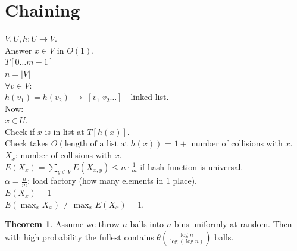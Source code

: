 \documentclass[a4paper, 12pt]{book}
\theoremstyle{definition}
\newtheorem{theorem}[counter]{Theorem}
\theoremstyle{remark}
\begin{document}
\section{Chaining}

$V, U, h: U \to V$. \\
Answer $x \in V$ in $O(1)$. \\
$T[0 \dots m-1]$ \\
$n = |V|$ \\
$\forall v \in V$: \\
$h(v_1) = h(v_2) \; \to \; [v_1 \; v_2 \dots]$ - linked list. \\
Now: \\
$x \in U$. \\
Check if $x$ is in list at $T[h(x)]$. \\
Check takes $O(\text{length of a list at }h(x))$ = $1 +$ number of collisions with $x$. \\
$X_x$: number of collisions with $x$. \\
$E(X_x) = \sum_{y \in V} E(X_{x,y}) \leq n \cdot \frac{1}{m}$ if hash function is universal. \\
$\alpha = \frac{n}{m}$: load factory (how many elements in $1$ place). \\
$E(X_x) = 1$ \\
$E(\max_x X_x) \neq \max_x E(X_x) = 1$.
\begin{theorem}
  Assume we throw $n$ balls into $n$ bins uniformly at random.
  Then with high probability the fullest contains
  $\theta\left(\frac{\log n}{\log (\log n)}\right)$ balls.
\end{theorem}
\end{document}
